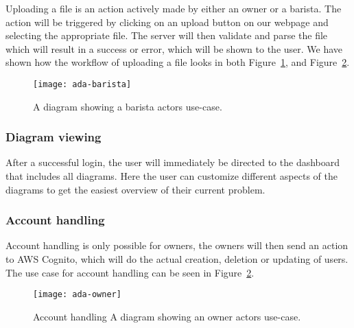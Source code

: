 Uploading a file is an action actively made by either an owner or a barista.
The action will be triggered by clicking on an upload button on our webpage and selecting the appropriate file.
The server will then validate and parse the file which will result in a success or error,
which will be shown to the user.
We have shown how the workflow of uploading a file looks in both Figure~\ref{fig:barista-conditional},
and Figure~\ref{fig:owner-conditional}.

\begin{figure}[H]
    \centering
    \texttt{[image: ada-barista]}
    \caption{A diagram showing a barista actors use-case.
    }\label{fig:barista-conditional}
\end{figure}

\subsubsection{Diagram viewing}\label{subsubsec:diagram_viewing_usecase}

After a successful login, the user will immediately be directed to the dashboard that includes all diagrams.
Here the user can customize different aspects of the diagrams to get the easiest overview of their current problem.

\subsubsection{Account handling}\label{subsubsec:account_handling_usecase}

Account handling is only possible for owners, the owners will then send an action to AWS Cognito, which will
do the actual creation, deletion or updating of users.
The use case for account handling can be seen in Figure~\ref{fig:owner-conditional}.

\begin{figure}[H]
    \centering
    \texttt{[image: ada-owner]}
    \caption{Account handling A diagram showing an owner actors use-case.
    }\label{fig:owner-conditional}
\end{figure}
